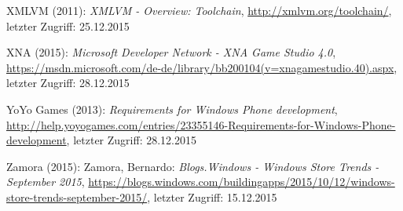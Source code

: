 \begin{thebibliography}{}
XMLVM (2011): \emph{XMLVM - Overview: Toolchain},
\url{http://xmlvm.org/toolchain/}, letzter Zugriff: 25.12.2015

XNA (2015): \emph{Microsoft Developer Network - XNA Game Studio 4.0},
\url{https://msdn.microsoft.com/de-de/library/bb200104(v=xnagamestudio.40).aspx}, letzter Zugriff: 28.12.2015

YoYo Games (2013): \emph{Requirements for Windows Phone development},
\url{http://help.yoyogames.com/entries/23355146-Requirements-for-Windows-Phone-development}, letzter Zugriff: 28.12.2015

Zamora (2015): Zamora, Bernardo: \emph{Blogs.Windows - Windows Store Trends - September 2015},
\url{https://blogs.windows.com/buildingapps/2015/10/12/windows-store-trends-september-2015/}, letzter Zugriff: 15.12.2015

\end{thebibliography}
\clearpage\thispagestyle{empty}
\eigen  %
